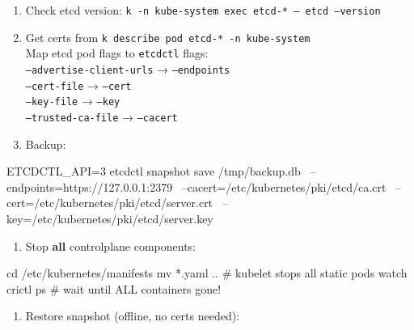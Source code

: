 \begin{tcbitemize}[
  raster columns=3, raster equal height=rows,
  blanker, cheat subtitle
]
\begin{tcbitemize}[
      raster columns=1, raster equal height=rows,
      blanker, cheat subtitle
    ]
      \tcbitem
          {\fontsize{6.5}{7.5}\selectfont\sffamily
          \begin{enumerate}[leftmargin=1.2em, itemsep=0pt, parsep=0pt, topsep=1pt]
            \item Check etcd version: \texttt{k -n kube-system exec etcd-* -- etcd --version}
            \item Get certs from \texttt{k describe pod etcd-* -n kube-system}\\
              Map etcd pod flags to \texttt{etcdctl} flags:\\
              \texttt{--advertise-client-urls} → \texttt{--endpoints}\\
              \texttt{--cert-file} → \texttt{--cert}\\
              \texttt{--key-file} → \texttt{--key}\\
              \texttt{--trusted-ca-file} → \texttt{--cacert}
            \item Backup:
          \end{enumerate}}
          \begin{cheatcodebash}
          ETCDCTL_API=3 etcdctl snapshot save /tmp/backup.db \
            --endpoints=https://127.0.0.1:2379 \
            --cacert=/etc/kubernetes/pki/etcd/ca.crt \
            --cert=/etc/kubernetes/pki/etcd/server.crt \
            --key=/etc/kubernetes/pki/etcd/server.key
          \end{cheatcodebash}
          \vspace{-0.5ex}
          {\fontsize{6.5}{7.5}\selectfont\sffamily
          \begin{enumerate}[leftmargin=1.2em, itemsep=0pt, parsep=0pt, topsep=1pt, start=3]
            \item Stop \textbf{all} controlplane components:
          \end{enumerate}}
          \begin{cheatcodebash}
          cd /etc/kubernetes/manifests
          mv *.yaml ..        # kubelet stops all static pods
          watch crictl ps     # wait until ALL containers gone!
          \end{cheatcodebash}
          \vspace{-0.5ex}
          {\fontsize{6.5}{7.5}\selectfont\sffamily
          \begin{enumerate}[leftmargin=1.2em, itemsep=0pt, parsep=0pt, topsep=1pt, start=4]
            \item Restore snapshot (offline, no certs needed):

\end{enumerate}}
\end{tcbitemize}
\end{tcbitemize}
